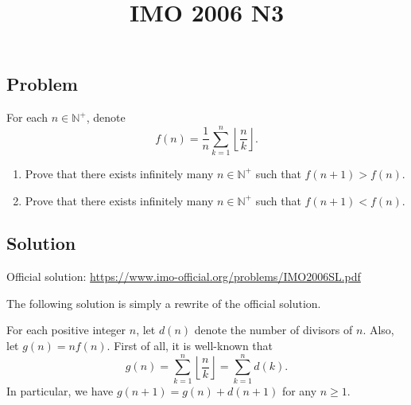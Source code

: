 \documentclass{article}
\title{IMO 2006 N3}
\author{}
\date{}
\newcommand{\N}{\mathbb{N}}
\begin{document}
\maketitle



\subsection*{Problem}

For each $n \in \N^+$, denote
\[ f(n) = \frac{1}{n} \sum_{k = 1}^n \left\lfloor \frac{n}{k} \right\rfloor. \]
\begin{enumerate}
    \item Prove that there exists infinitely many $n \in \N^+$ such that $f(n + 1) > f(n)$.
    \item Prove that there exists infinitely many $n \in \N^+$ such that $f(n + 1) < f(n)$.
\end{enumerate}



\subsection*{Solution}

Official solution: \url{https://www.imo-official.org/problems/IMO2006SL.pdf}

The following solution is simply a rewrite of the official solution.

For each positive integer $n$, let $d(n)$ denote the number of divisors of $n$.
Also, let $g(n) = n f(n)$.
First of all, it is well-known that
\[ g(n) = \sum_{k = 1}^n \left\lfloor \frac{n}{k} \right\rfloor = \sum_{k = 1}^n d(k). \]
In particular, we have $g(n + 1) = g(n) + d(n + 1)$ for any $n \geq 1$.
\end{document}

